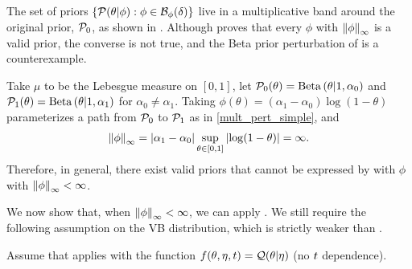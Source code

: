 The set of priors $\left\{\mathcal{P}(\theta \vert \phi) : \phi \in
\mathcal{B}_\phi(\delta)\right\}$ live in a multiplicative band around the original
prior, $\mathcal{P}_{0}$, as shown in . Although
 proves that every $\phi$ with $\left\Vert\phi\right\Vert_{\infty}$ is a
valid prior, the converse is not true, and the Beta prior perturbation of
 is a counterexample.

\FunctionBallFig{}


\begin{ex}
%
Take $\mu$ to be the Lebesgue measure on $[0,1]$, let $\mathcal{P}_{0}(\theta) =
\mathrm{Beta}\left(\theta \vert 1, \alpha_0\right)$ and $\mathcal{P}_{1}(\theta) = \mathrm{Beta}\left(\theta \vert
1, \alpha_1\right)$ for $\alpha_0 \ne \alpha_1$.  Taking
$\phi(\theta) = (\alpha_1 - \alpha_0) \log(1 - \theta)$ parameterizes
a path from $\mathcal{P}_{0}$ to $\mathcal{P}_{1}$ as in \eqref{mult_pert_simple}, and
%
\begin{align*}
%
\norminf{\phi} =
    \abs{\alpha_1 - \alpha_0} \sup_{\theta \in [0,1]} \abs{\log(1 - \theta)} =
    \infty.
%
\end{align*}
%
Therefore, in general, there exist valid priors that cannot be expressed by
 with $\phi$ with $\left\Vert\phi\right\Vert_{\infty} < \infty$.
%
\end{ex}

We now show that, when $\left\Vert\phi\right\Vert_{\infty} < \infty$, we can apply
.  We still require the following assumption on the VB
distribution, which is strictly weaker than .

\begin{assu}
%
Assume that  applies with the function $f(\theta, \eta,
t) = \mathcal{Q}(\theta \vert \eta)$ (no $t$ dependence).
%
\end{assu}


